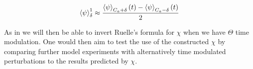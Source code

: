 \begin{align}
\expval{\psi}^1_\delta \approx \frac{\expval{\psi}_{C_a + \delta}(t) - \expval{\psi}_{C_a - \delta}(t)}{2}
\end{align}

\noindent As in \cite{Lucarini2017a} we will then be able to invert Ruelle's formula for $\chi$ when we have $\Theta$ time modulation. One would then aim to test the use of the constructed $\chi$ by comparing further model experiments with alternatively time modulated perturbations to the results predicted by $\chi$.